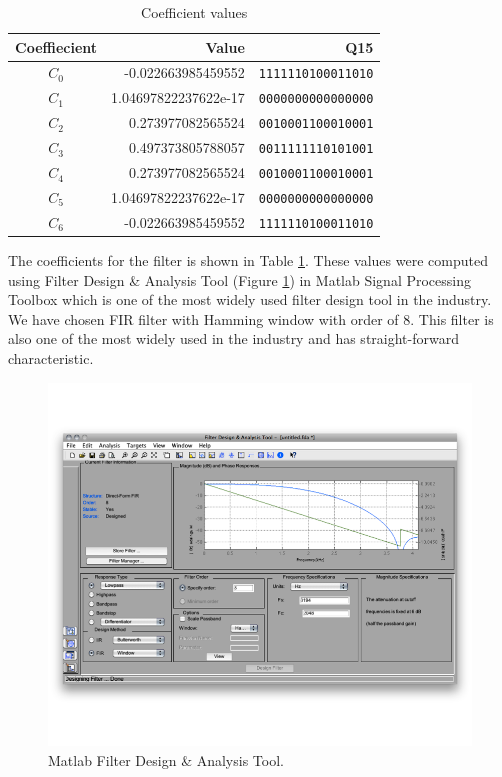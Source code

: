 \begin{table}[ht]
\centering
\begin{tabular}{ c | r | r }
\hline
Coeffiecient & Value & Q15 \\
\hline \hline
$C_0$ & -0.022663985459552   & \texttt{1111110100011010} \\
$C_1$ & 1.04697822237622e-17 & \texttt{0000000000000000} \\
$C_2$ & 0.273977082565524    & \texttt{0010001100010001}\\
$C_3$ & 0.497373805788057    & \texttt{0011111110101001}\\
$C_4$ & 0.273977082565524    & \texttt{0010001100010001}\\
$C_5$ & 1.04697822237622e-17 & \texttt{0000000000000000} \\
$C_6$ & -0.022663985459552   & \texttt{1111110100011010} \\
\end{tabular}
\caption{Coefficient values}
\label{tab:coefficients}
\end{table}

The coefficients for the filter is shown in Table \ref{tab:coefficients}. These values were computed using Filter Design \& Analysis Tool (Figure \ref{fig:matlab}) in Matlab Signal Processing Toolbox which is one of the most widely used filter design tool in the industry. We have chosen FIR filter with Hamming window with order of 8. This filter is also one of the most widely used in the industry and has straight-forward characteristic.

\begin{figure}[ht]
	\centering
	\includegraphics[width=6.5in]{images/matlab}
	\caption{Matlab Filter Design \& Analysis Tool.}
	\label{fig:matlab}
\end{figure}
